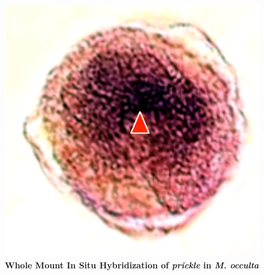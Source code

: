 \begin{figure}[tbp]
\centering
\includegraphics[scale=0.55]{figures/prickle.pdf}
\caption{\textbf{Whole Mount In Situ Hybridization of \textit{prickle} in \textit{M. occulta}} }
\label{fig:prickle}
\end{figure}